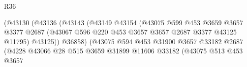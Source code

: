 \begin{lexlean}{R36}
\begin{coremodule}
                                              (@43130
                                                (@43136
                                                  (@43143
                                                    (@43149
                                                      @43154
                                                      (@43075
                                                        @599
                                                        @453
                                                        @3659
                                                        @3657
                                                        @3377
                                                        @2687
                                                        (@43067
                                                          @596
                                                          @220
                                                          @453
                                                          @3657
                                                          @3657
                                                          @2687
                                                          @3377
                                                          @43125
                                                          @11795)
                                                        @43125))
                                                    @36858)
                                                  (@43075
                                                    @594
                                                    @453
                                                    @31900
                                                    @3657
                                                    @33182
                                                    @2687
                                                    (@4228
                                                      @43066
                                                      @28
                                                      @515
                                                      @3659
                                                      @31899
                                                      @11606
                                                      @33182
                                                      (@43075
                                                        @513
                                                        @453
                                                        @3657

\end{coremodule}
\end{lexlean}
